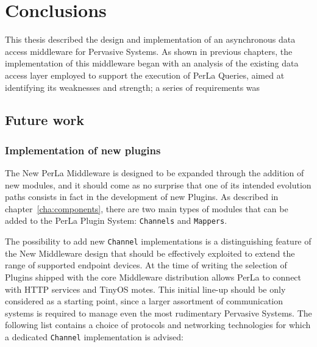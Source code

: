 \chapter{Conclusions}
\label{cha:conclusions}

This thesis described the design and implementation of an asynchronous data
access middleware for Pervasive Systems. As shown in previous chapters, the
implementation of this middleware began with an analysis of the existing data
access layer employed to support the execution of PerLa Queries, aimed at
identifying its weaknesses and strength; a series of requirements was 


\section{Future work}

\subsection{Implementation of new plugins}

The New PerLa Middleware is designed to be expanded through the addition of new
modules, and it should come as no surprise that one of its intended evolution
paths consists in fact in the development of new Plugins. As described in
chapter~\ref{cha:components}, there are two main types of modules that can be
added to the PerLa Plugin System: \texttt{Channels} and \texttt{Mappers}.

The possibility to add new \texttt{Channel} implementations is a distinguishing
feature of the New Middleware design that should be effectively exploited to
extend the range of supported endpoint devices. At the time of writing the
selection of Plugins shipped with the core Middleware distribution allows PerLa
to connect with HTTP services and TinyOS motes. This initial line-up should be
only considered as a starting point, since a larger assortment of communication
systems is required to manage even the most rudimentary Pervasive Systems. The
following list contains a choice of protocols and networking technologies for
which a dedicated \texttt{Channel} implementation is advised:

